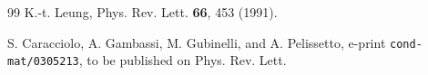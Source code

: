 \documentclass[12pt]{article}
\begin{document}
\begin{thebibliography}{99}
K.-t. Leung, Phys. Rev. Lett. {\bf 66}, 453 (1991).

S. Caracciolo, A. Gambassi, M. Gubinelli, and 
A. Pelissetto,  e-print {\tt cond-mat/0305213}, 
to be published on Phys. Rev. Lett.



\end{thebibliography}




\newpage
\end{document}
